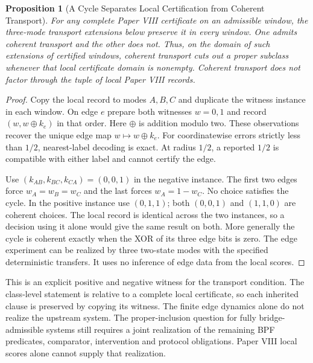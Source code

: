 \documentclass[11pt,a4paper]{article}
\newtheorem{proposition}[theorem]{Proposition}
\theoremstyle{definition}
\begin{document}
\begin{proposition}[A Cycle Separates Local Certification from Coherent Transport]\label{prop:bridge-transport-cycle}
For any complete Paper VIII certificate on an admissible window, the three-mode transport extensions below preserve it in every window. One admits coherent transport and the other does not. Thus, on the domain of such extensions of certified windows, coherent transport cuts out a proper subclass whenever that local certificate domain is nonempty. Coherent transport does not factor through the tuple of local Paper VIII records.
\end{proposition}
\begin{proof}
Copy the local record to modes $A,B,C$ and duplicate the witness instance in each window. On edge $e$ prepare both witnesses $w=0,1$ and record $(w,w\oplus k_e)$ in that order. Here $\oplus$ is addition modulo two. These observations recover the unique edge map $w\mapsto w\oplus k_e$. For coordinatewise errors strictly less than $1/2$, nearest-label decoding is exact. At radius $1/2$, a reported $1/2$ is compatible with either label and cannot certify the edge.

Use $(k_{AB},k_{BC},k_{CA})=(0,0,1)$ in the negative instance. The first two edges force $w_A=w_B=w_C$ and the last forces $w_A=1-w_C$. No choice satisfies the cycle. In the positive instance use $(0,1,1)$; both $(0,0,1)$ and $(1,1,0)$ are coherent choices. The local record is identical across the two instances, so a decision using it alone would give the same result on both. More generally the cycle is coherent exactly when the XOR of its three edge bits is zero. The edge experiment can be realized by three two-state modes with the specified deterministic transfers. It uses no inference of edge data from the local scores.
\end{proof}

This is an explicit positive and negative witness for the transport condition. The class-level statement is relative to a complete local certificate, so each inherited clause is preserved by copying its witness. The finite edge dynamics alone do not realize the upstream system. The proper-inclusion question for fully bridge-admissible systems still requires a joint realization of the remaining BPF predicates, comparator, intervention and protocol obligations. Paper VIII local scores alone cannot supply that realization.
\end{document}
